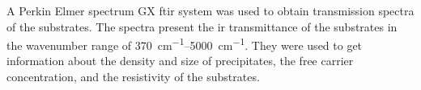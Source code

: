 A Perkin Elmer spectrum GX \ac{ftir} system was used to obtain transmission spectra of the substrates. The spectra present the \ac{ir} transmittance of the substrates in the wavenumber range of \SIrange{370}{5000}{\centi\metre^{-1}}. They were used to get information about the density and size of  precipitates, the free carrier concentration, and the resistivity of the substrates. %

